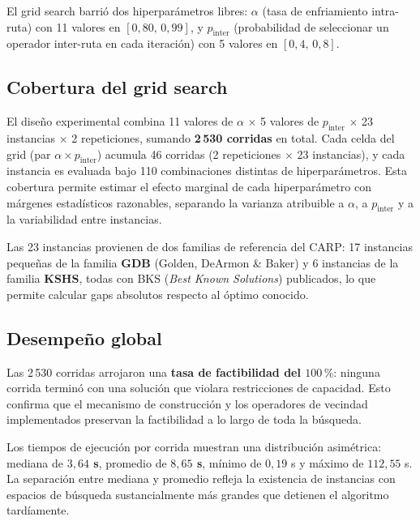 El grid search barrió dos hiperparámetros libres: \(\alpha\) (tasa de enfriamiento
intra-ruta) con 11 valores en \([0{,}80,\, 0{,}99]\), y \(p_{\text{inter}}\)
(probabilidad de seleccionar un operador inter-ruta en cada iteración) con 5 valores
en \([0{,}4,\, 0{,}8]\).

\subsection{Cobertura del grid search}
\label{subsec:cobertura_grid}

El diseño experimental combina 11 valores de \(\alpha\) \(\times\) 5 valores de
\(p_{\text{inter}}\) \(\times\) 23 instancias \(\times\) 2 repeticiones, sumando
\textbf{2\,530 corridas} en total. Cada celda del grid (par
\(\alpha \times p_{\text{inter}}\)) acumula 46 corridas (2 repeticiones \(\times\) 23
instancias), y cada instancia es evaluada bajo 110 combinaciones distintas de
hiperparámetros. Esta cobertura permite estimar el efecto marginal de cada
hiperparámetro con márgenes estadísticos razonables, separando la varianza atribuible
a \(\alpha\), a \(p_{\text{inter}}\) y a la variabilidad entre instancias.

Las 23 instancias provienen de dos familias de referencia del CARP: 17 instancias
pequeñas de la familia \textbf{GDB} (Golden, DeArmon \& Baker) y 6 instancias de la
familia \textbf{KSHS}, todas con BKS (\emph{Best Known Solutions}) publicados, lo que
permite calcular gaps absolutos respecto al óptimo conocido.

\subsection{Desempeño global}
\label{subsec:desempeno_global}

Las 2\,530 corridas arrojaron una \textbf{tasa de factibilidad del \(100\,\%\)}: ninguna
corrida terminó con una solución que violara restricciones de capacidad. Esto confirma
que el mecanismo de construcción y los operadores de vecindad implementados preservan
la factibilidad a lo largo de toda la búsqueda.

Los tiempos de ejecución por corrida muestran una distribución asimétrica: mediana de
\textbf{\(3{,}64\) s}, promedio de \textbf{\(8{,}65\) s}, mínimo de \(0{,}19\) s y
máximo de \(112{,}55\) s. La separación entre mediana y promedio refleja la existencia
de instancias con espacios de búsqueda sustancialmente más grandes que detienen el
algoritmo tardíamente.

